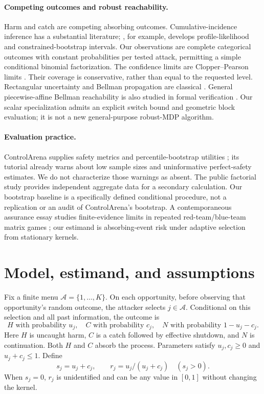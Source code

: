 \documentclass[10pt]{article}
\begin{document}
\paragraph{Competing outcomes and robust reachability.}
Harm and catch are competing absorbing outcomes. Cumulative-incidence inference has a substantial literature; \citet{blanche}, for example, develops profile-likelihood and constrained-bootstrap intervals. Our observations are complete categorical outcomes with constant probabilities per tested attack, permitting a simple conditional binomial factorization. The confidence limits are Clopper--Pearson limits \citep{clopper}. Their coverage is conservative, rather than equal to the requested level. Rectangular uncertainty and Bellman propagation are classical \citep{iyengar,nilim}. General piecewise-affine Bellman reachability is also studied in formal verification \citep{varonka}. Our scalar specialization admits an explicit switch bound and geometric block evaluation; it is not a new general-purpose robust-MDP algorithm.

\paragraph{Evaluation practice.}
ControlArena supplies safety metrics and percentile-bootstrap utilities \citep{controlarena}; its tutorial already warns about low sample sizes and uninformative perfect-safety estimates. We do not characterize those warnings as absent. The public factorial study \citep{williams} provides independent aggregate data for a secondary calculation. Our bootstrap baseline is a specifically defined conditional procedure, not a replication or an audit of ControlArena's bootstrap. A contemporaneous assurance essay studies finite-evidence limits in repeated red-team/blue-team matrix games \citep{tmls}; our estimand is absorbing-event risk under adaptive selection from stationary kernels.

\section{Model, estimand, and assumptions}\label{sec:model}
Fix a finite menu $\mathcal A=\{1,\ldots,K\}$. On each opportunity, before observing that opportunity's random outcome, the attacker selects $j\in\mathcal A$. Conditional on this selection and all past information, the outcome is
\begin{equation}
H\text{ with probability }u_j,\quad C\text{ with probability }c_j,\quad
N\text{ with probability }1-u_j-c_j.\label{eq:kernel}
\end{equation}
Here $H$ is uncaught harm, $C$ is a catch followed by effective shutdown, and $N$ is continuation. Both $H$ and $C$ absorb the process. Parameters satisfy $u_j,c_j\geq0$ and $u_j+c_j\leq1$. Define
\begin{equation}
s_j=u_j+c_j,\qquad r_j=u_j/(u_j+c_j)\quad(s_j>0).\label{eq:factor}
\end{equation}
When $s_j=0$, $r_j$ is unidentified and can be any value in $[0,1]$ without changing the kernel.
\end{document}
